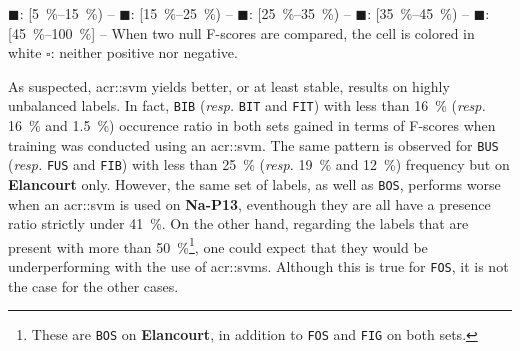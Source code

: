 \begin{table}[htbp]
{                \textcolor{GAIN0515}{\(\blacksquare\)}: [\SIrange[range-phrase={, }]{5}{15}{\percent}) --
                \textcolor{GAIN1525}{\(\blacksquare\)}: [\SIrange[range-phrase={, }]{15}{25}{\percent}) --
                \textcolor{GAIN2535}{\(\blacksquare\)}: [\SIrange[range-phrase={, }]{25}{35}{\percent}) --
                \textcolor{GAIN3545}{\(\blacksquare\)}: [\SIrange[range-phrase={, }]{35}{45}{\percent}) --
                \textcolor{GAIN45}{\(\blacksquare\)}: [\SIrange[range-phrase={, }]{45}{100}{\percent}] --
                When two null F-scores are compared, the cell is colored in white \(\square\): neither positive nor negative.
            }
        \end{table}

        As suspected, \gls{acr::svm} yields better, or at least stable, results on highly unbalanced labels.
        In fact, \texttt{BIB} (\textit{resp.} \texttt{BIT} and \texttt{FIT}) with less than \SI{16}{\percent} (\textit{resp.} \SI{16}{\percent} and \SI{1.5}{\percent}) occurence ratio in both sets gained in terms of F-scores when training was conducted using an \gls{acr::svm}.
        The same pattern is observed for \texttt{BUS} (\textit{resp.} \texttt{FUS} and \texttt{FIB}) with less than \SI{25}{\percent} (\textit{resp.} \SI{19}{\percent} and \SI{12}{\percent}) frequency but on \textbf{Elancourt} only.
        However, the same set of labels, as well as \texttt{BOS}, performs worse when an \gls{acr::svm} is used on \textbf{Na-P13}, eventhough they are all have a presence ratio strictly under \SI{41}{\percent}.
        On the other hand, regarding the labels that are present with more than \SI{50}{\percent}\footnote{
            These are \texttt{BOS} on \textbf{Elancourt}, in addition to \texttt{FOS} and \texttt{FIG} on both sets.
        }, one could expect that they would be underperforming with the use of \glspl{acr::svm}.
        Although this is true for \texttt{FOS}, it is not the case for the other cases.\\

